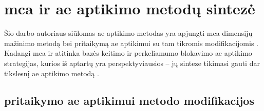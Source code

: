 \section{\gls*{mca} ir \LIME \gls*{ae} aptikimo metodų sintezė}\label{sec:method}

Šio darbo autoriaus siūlomas \gls{ae} aptikimo metodas yra apjungti \gls{mca} dimensijų
mažinimo metodą bei \LIME pritaikymą \gls{ae} aptikimui su tam tikromis
modifikacijomis . Kadangi \gls{mca} ir \LIME atitinka
bazės keitimo  ir perkeliamumo
blokavimo  \gls{ae} aptikimo
strategijas, kurios iš aptartų yra perspektyviausios -- jų sinteze tikimasi
gauti dar tikslesnį \gls{ae} aptikimo metodą .

\subsection{\LIME pritaikymo \gls{ae} aptikimui metodo modifikacijos}\label{sec:method:mods}

